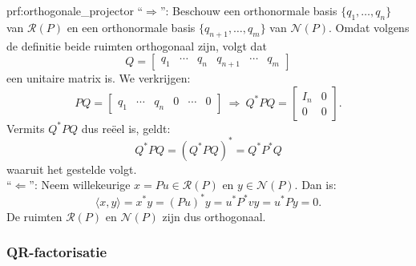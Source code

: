 \begin{prf}{prf:orthogonale_projector}
    ``$\Rightarrow$'': Beschouw een orthonormale basis $\{q_1, \ldots, q_n\}$ van $\mathcal{R}(P)$ en een orthonormale basis $\{q_{n+1}, \ldots, q_m\}$ van $\mathcal{N}(P)$. Omdat volgens de definitie beide ruimten orthogonaal zijn, volgt dat
    \begin{equation*}
        Q = \begin{bmatrix} q_1 & \cdots & q_n & q_{n+1} & \cdots & q_m \end{bmatrix}
    \end{equation*}
     een unitaire matrix is. We verkrijgen:
    \begin{equation*}
        PQ = \begin{bmatrix} q_1 & \cdots & q_n &0 & \cdots & 0 \end{bmatrix} \ \Rightarrow \ Q^*PQ = \begin{bmatrix} I_n & 0 \\ 0 & 0 \end{bmatrix}.
    \end{equation*}
    Vermits $Q^*PQ$ dus reëel is, geldt:
    \begin{equation*}
        Q^*PQ = (Q^*PQ)^* = Q^*P^*Q
    \end{equation*}
    waaruit het gestelde volgt. \\

    ``$\Leftarrow$'': Neem willekeurige $x = Pu \in \mathcal{R}(P)$ en $y \in \mathcal{N}(P)$. Dan is:
    \begin{equation*}
        \langle x, y \rangle = x^*y = (Pu)^*y = u^*P^*vy= u^*Py = 0.
    \end{equation*}
    De ruimten $\mathcal{R}(P)$ en $\mathcal{N}(P)$ zijn dus orthogonaal.
    \vspace{-0.3cm}
\end{prf}

\subsubsection{QR-factorisatie}

\vspace{0.5cm}

